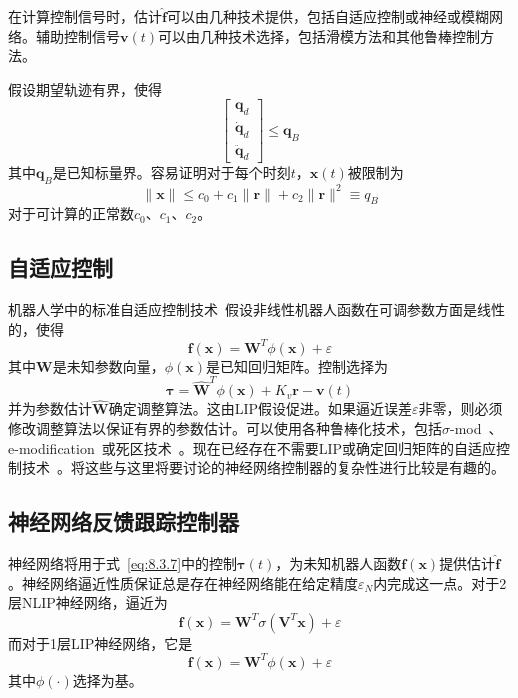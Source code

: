 \documentclass[12pt,a4paper]{ctexart}
\begin{document}
在计算控制信号时，估计$\hat{\bm{f}}$可以由几种技术提供，包括自适应控制或神经或模糊网络。辅助控制信号$\bm{v}(t)$可以由几种技术选择，包括滑模方法和其他鲁棒控制方法。

假设期望轨迹有界，使得
\begin{equation}\label{eq:8.3.9}
\begin{bmatrix} \bm{q}_d \\ \dot{\bm{q}}_d \\ \ddot{\bm{q}}_d \end{bmatrix} \leq \bm{q}_B
\end{equation}
其中$\bm{q}_B$是已知标量界。容易证明对于每个时刻$t$，$\bm{x}(t)$被限制为
\begin{equation}\label{eq:8.3.10}
\|\bm{x}\| \leq c_0 + c_1\|\bm{r}\| + c_2\|\bm{r}\|^2 \equiv q_B
\end{equation}
对于可计算的正常数$c_0$、$c_1$、$c_2$。

\subsection{自适应控制}

机器人学中的标准自适应控制技术~\cite{craig1988,slotine1988,spong1989,lewis1993}假设非线性机器人函数在可调参数方面是线性的，使得
\begin{equation}\label{eq:8.3.11}
\bm{f}(\bm{x}) = \bm{W}^T \phi(\bm{x}) + \varepsilon
\end{equation}
其中$\bm{W}$是未知参数向量，$\phi(\bm{x})$是已知回归矩阵。控制选择为
\begin{equation}\label{eq:8.3.12}
\bm{\tau} = \hat{\bm{W}}^T \phi(\bm{x}) + K_v\bm{r} - \bm{v}(t)
\end{equation}
并为参数估计$\hat{\bm{W}}$确定调整算法。这由LIP假设促进。如果逼近误差$\varepsilon$非零，则必须修改调整算法以保证有界的参数估计。可以使用各种鲁棒化技术，包括$\sigma$-mod~\cite{ioannou1984}、e-modification~\cite{narendra1987}或死区技术~\cite{kreisselmeier1986}。现在已经存在不需要LIP或确定回归矩阵的自适应控制技术~\cite{colbaugh1994}。将这些与这里将要讨论的神经网络控制器的复杂性进行比较是有趣的。

\subsection{神经网络反馈跟踪控制器}

神经网络将用于式~\eqref{eq:8.3.7}中的控制$\bm{\tau}(t)$，为未知机器人函数$\bm{f}(\bm{x})$提供估计$\hat{\bm{f}}$。神经网络逼近性质保证总是存在神经网络能在给定精度$\varepsilon_N$内完成这一点。对于2层NLIP神经网络，逼近为
\begin{equation}\label{eq:8.3.13}
\bm{f}(\bm{x}) = \bm{W}^T \sigma(\bm{V}^T \bm{x}) + \varepsilon
\end{equation}
而对于1层LIP神经网络，它是
\begin{equation}\label{eq:8.3.14}
\bm{f}(\bm{x}) = \bm{W}^T \phi(\bm{x}) + \varepsilon
\end{equation}
其中$\phi(\cdot)$选择为基。
\end{document}

